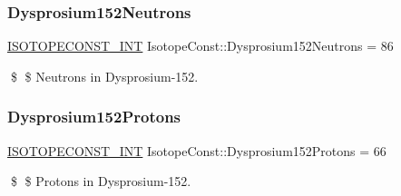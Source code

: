\subsubsection{\texorpdfstring{Dysprosium152\+Neutrons}{Dysprosium152Neutrons}}
{\footnotesize\ttfamily \mbox{\hyperlink{group___isotope_const-_macros_ga5f18360b3e99483a35c32d789e62621c}{I\+S\+O\+T\+O\+P\+E\+C\+O\+N\+S\+T\+\_\+\+I\+NT}} Isotope\+Const\+::\+Dysprosium152\+Neutrons = 86}

\$ \$ Neutrons in Dysprosium-\/152. \mbox{\label{group___isotope_const-_dysprosium-_dy152_gae93ecafbe7f8bf049733d9a15eeed81f}} 
\subsubsection{\texorpdfstring{Dysprosium152\+Protons}{Dysprosium152Protons}}
{\footnotesize\ttfamily \mbox{\hyperlink{group___isotope_const-_macros_ga5f18360b3e99483a35c32d789e62621c}{I\+S\+O\+T\+O\+P\+E\+C\+O\+N\+S\+T\+\_\+\+I\+NT}} Isotope\+Const\+::\+Dysprosium152\+Protons = 66}

\$ \$ Protons in Dysprosium-\/152. 